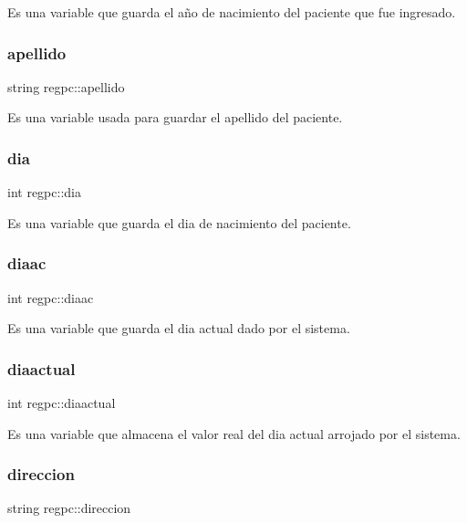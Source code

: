 Es una variable que guarda el año de nacimiento del paciente que fue ingresado. \mbox{\label{classregpc_a8b52a6da10996801ea903a96ae8123da}} 
\subsubsection{\texorpdfstring{apellido}{apellido}}
{\footnotesize\ttfamily string regpc\+::apellido}

Es una variable usada para guardar el apellido del paciente. \mbox{\label{classregpc_ad83f7e1e40414037d8da89c050c239ea}} 
\subsubsection{\texorpdfstring{dia}{dia}}
{\footnotesize\ttfamily int regpc\+::dia}

Es una variable que guarda el dia de nacimiento del paciente. \mbox{\label{classregpc_a69ada6ac0632885a0633c1cb8615642c}} 
\subsubsection{\texorpdfstring{diaac}{diaac}}
{\footnotesize\ttfamily int regpc\+::diaac}

Es una variable que guarda el dia actual dado por el sistema. \mbox{\label{classregpc_a81c1c48cfc985ea5d53439bf14f6b73a}} 
\subsubsection{\texorpdfstring{diaactual}{diaactual}}
{\footnotesize\ttfamily int regpc\+::diaactual}

Es una variable que almacena el valor real del dia actual arrojado por el sistema. \mbox{\label{classregpc_a316ab55a02639999cc96f751997a521e}} 
\subsubsection{\texorpdfstring{direccion}{direccion}}
{\footnotesize\ttfamily string regpc\+::direccion}

